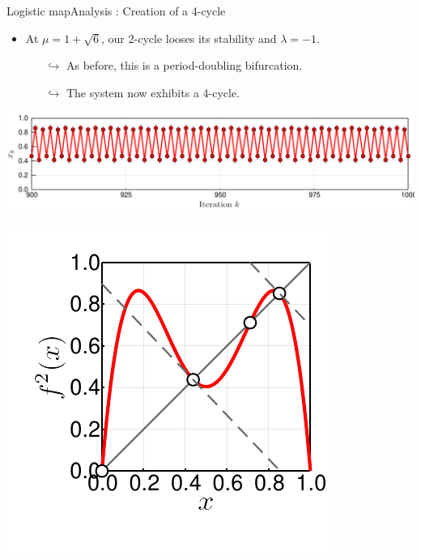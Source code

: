 \documentclass[usenames,dvipsnames,svgnames,10pt,aspectratio=169]{beamer}
\begin{document}
\begin{frame}[t, c]{Logistic map}{Analysis : Creation of a 4-cycle}
	\begin{minipage}{.68\textwidth}
		\begin{itemize}
			\item At \( \mu = 1 + \sqrt{6} \), our 2-cycle looses its stability and \( \lambda = -1 \).
			\begin{itemize}
				\item[\( \hookrightarrow \)] As before, this is a period-doubling bifurcation.
				\item[\( \hookrightarrow \)] The system now exhibits a 4-cycle.
			\end{itemize}
		\end{itemize}

		\medskip

		\includegraphics[width=\textwidth]{cycle_4_time_series}
	\end{minipage}%
	\hfill
	\begin{minipage}{.28\textwidth}
		\centering
		\includegraphics[width=\textwidth]{cycle_4_creation}
	\end{minipage}

	\vspace{1cm}
\end{frame}
\end{document}
